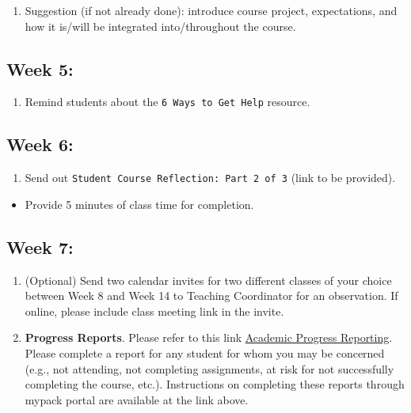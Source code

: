 \documentclass[
]{book}
\providecommand{\tightlist}{%
  \setlength{\itemsep}{0pt}\setlength{\parskip}{0pt}}
\begin{document}
\begin{enumerate}
\def\labelenumi{\arabic{enumi})}
\tightlist
\item
  Suggestion (if not already done): introduce course project, expectations, and how it is/will be integrated into/throughout the course.
\end{enumerate}

\hypertarget{week-5}{%
\subsection{Week 5:}\label{week-5}}

\begin{enumerate}
\def\labelenumi{\arabic{enumi})}
\tightlist
\item
  Remind students about the \texttt{6\ Ways\ to\ Get\ Help} resource.
\end{enumerate}

\hypertarget{week-6}{%
\subsection{Week 6:}\label{week-6}}

\begin{enumerate}
\def\labelenumi{\arabic{enumi})}
\tightlist
\item
  Send out \texttt{Student\ Course\ Reflection:\ Part\ 2\ of\ 3} (link to be provided).
\end{enumerate}

\begin{itemize}
\tightlist
\item
  Provide 5 minutes of class time for completion.
\end{itemize}

\hypertarget{week-7}{%
\subsection{Week 7:}\label{week-7}}

\begin{enumerate}
\def\labelenumi{\arabic{enumi})}
\item
  (Optional) Send two calendar invites for two different classes of your choice between Week 8 and Week 14 to Teaching Coordinator for an observation. If online, please include class meeting link in the invite.
\item
  \textbf{Progress Reports}. Please refer to this link \href{https://dasa.ncsu.edu/faculty-resources/academic-progress-reporting/}{Academic Progress Reporting}. Please complete a report for any student for whom you may be concerned (e.g., not attending, not completing assignments, at risk for not successfully completing the course, etc.). Instructions on completing these reports through mypack portal are available at the link above.
\end{enumerate}
\end{document}
